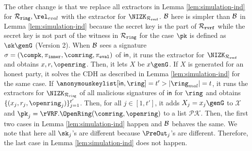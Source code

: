 The other change is that we replace all extractors in Lemma \ref{lem:simulation-ind} for $ \Rring, \rel_{eval} $ with the extractor  for $ \NIZK_{\relrvrf} $. $ \mathcal{B} $ here is simpler than $ \mathcal{B}$ in Lemma \ref{lem:simulation-ind} because the secret key is the part of  $\mathcal{R}_{\mathtt{rvrf}}$ while the secret key is not part of the witness in $ \mathcal{R}_{\mathtt{ring}} $ for the case $ \pk $ is defined as $ \sk\genG $ (Version 2).
When $ \mathcal{B} $ sees a signature $ \sigma = (\compk, \pi_{\mathtt{inner}},\comring, \pieval)  $ of $ \mathsf{in} $, it runs the extractor for $ \NIZK_{\relrvrf} $ and obtains $ x,r, \openring $. Then, it lets $ X $ be $ x\genG $. If $ X $ is generated for an honest party, it solves the CDH as described in Lemma \ref{lem:simulation-ind} for the same case. If $ \anonymouskeylist[\msg,\ring] = t' > |\ring_{mal}| = t$, it runs the extractors for $ \NIZK_{\Rring} $ of all malicious signatures of $ \mathsf{in} $ for $ \ring $ and obtains $ \{(x_j,r_j,\openring_j)\}_{j = 1}^{t'}$. Then, for all $ j \in [1,t']$, it adds $ X_j = x_j \genG $ to $ \mathcal{X} $ and $ \pk_j  = \rVRF.\OpenRing(\comring,\openring)$ to a list $ \mathcal{PK} $. Then, the first two cases in Lemma \ref{lem:simulation-ind} happen and $ \mathcal{B} $ behaves the same.
We note that here all $ \sk_j $'s are different because $ \PreOut_j $'s are different. Therefore, the last case in Lemma  \ref{lem:simulation-ind} does not happen.



